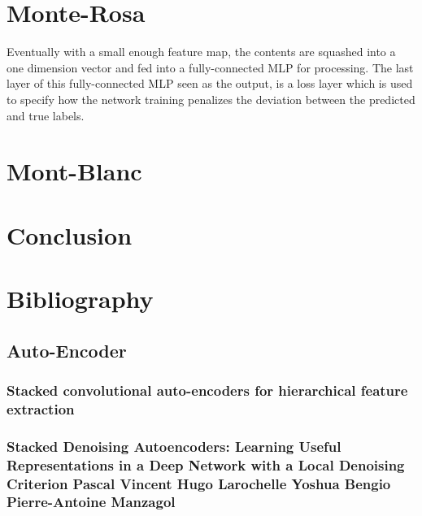 \documentclass[final, paper=letter,5p,times,twocolumn]{elsarticle}
\begin{document}
\section{Monte-Rosa}


Eventually with a small enough feature map, the contents are squashed into a one dimension vector and fed into a fully-connected MLP for processing. The last layer of this fully-connected MLP seen as the output, is a loss layer which is used to specify how the network training penalizes the deviation between the predicted and true labels.


\section{Mont-Blanc}


\section{Conclusion}


\section{Bibliography}

\subsection{Auto-Encoder}

\subsubsection{Stacked convolutional auto-encoders for hierarchical feature extraction}

\subsubsection{Stacked Denoising Autoencoders: Learning Useful Representations in a Deep Network with a Local Denoising Criterion Pascal Vincent Hugo Larochelle Yoshua Bengio Pierre-Antoine Manzagol}
\end{document}
